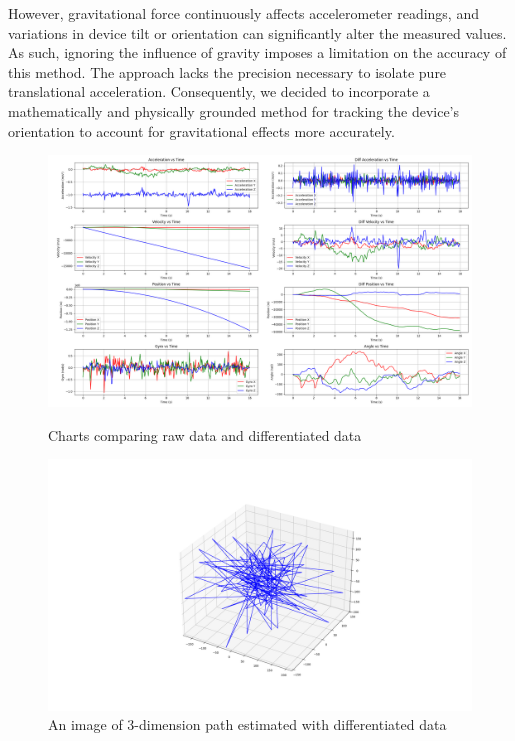 \documentclass{article}
\begin{document}
    However, gravitational force continuously affects accelerometer readings, and
    variations in device tilt or orientation can significantly alter the measured
    values. As such, ignoring the influence of gravity imposes a limitation on the
    accuracy of this method. The approach lacks the precision necessary to
    isolate pure translational acceleration. Consequently, we decided to
    incorporate a mathematically and physically grounded method for tracking the
    device’s orientation to account for gravitational effects more accurately. \FloatBarrier
    \begin{figure}
        \centering
        \includegraphics[width=\textwidth]{
            Images/data_difference_and_integration.png
        }
        \caption{Charts comparing raw data and differentiated data}
        \label{fig:data_difference_and_integration}
        \centering
        \includegraphics[width=\textwidth]{Images/error_3d_path.png}
        \caption{An image of 3-dimension path estimated with differentiated data}
        \label{fig:error_3d_path}
    \end{figure}
\end{document}
